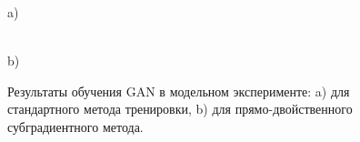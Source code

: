 \documentclass[preprint,12pt]{elsarticle}
\begin{document}
\begin{figure}[h]
\begin{minipage}[h]{0.47\linewidth}
 a) \\
\end{minipage}
\hfill
\begin{minipage}[h]{0.47\linewidth}
 \\b)
\end{minipage}
\vfill

\caption{Результаты обучения GAN в модельном эксперименте: a) для стандартного метода тренировки, b) для прямо-двойственного субградиентного метода.  }
\label{ris:experiments toy example}
\end{figure}
\end{document}
